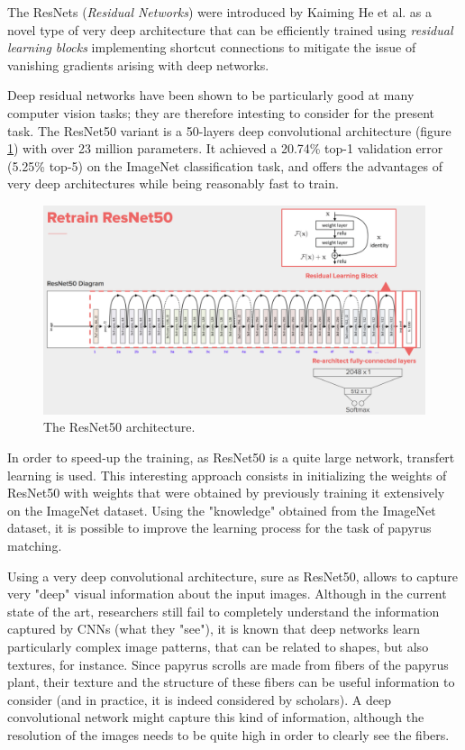 \documentclass[11pt]{report}
\begin{document}
The ResNets (\emph{Residual Networks}) were introduced by Kaiming He et al. \cite{res15} as a novel type of very deep architecture that can be efficiently trained using \emph{residual learning blocks} implementing shortcut connections to mitigate the issue of vanishing gradients arising with deep networks.\newline




Deep residual networks have been shown to be particularly good at many computer vision tasks; they are therefore intesting to consider for the present task.\newline
The ResNet50 variant is a 50-layers deep convolutional architecture (figure \ref{resnet50}) with over 23 million parameters. It achieved a 20.74\% top-1 validation error (5.25\% top-5) on the ImageNet classification task, and offers the advantages of very deep architectures while being reasonably fast to train.

\begin{figure}[H]
\centering\includegraphics[width=13cm]{resnet50.png}
\caption{The ResNet50 architecture.}
\label{resnet50}
\end{figure}

In order to speed-up the training, as ResNet50 is a quite large network, transfert learning is used. This interesting approach consists in initializing the weights of ResNet50 with weights that were obtained by previously training it extensively on the ImageNet dataset. Using the "knowledge" obtained from the ImageNet dataset, it is possible to improve the learning process for the task of papyrus matching.\newline

Using a very deep convolutional architecture, sure as ResNet50, allows to capture very "deep" visual information about the input images. Although in the current state of the art, researchers still fail to completely understand the information captured by CNNs (what they "see"), it is known that deep networks learn particularly complex image patterns, that can be related to shapes, but also textures, for instance. Since papyrus scrolls are made from fibers of the papyrus plant, their texture and the structure of these fibers can be useful information to consider (and in practice, it is indeed considered by scholars). A deep convolutional network might capture this kind of information, although the resolution of the images needs to be quite high in order to clearly see the fibers.\newline
\end{document}

